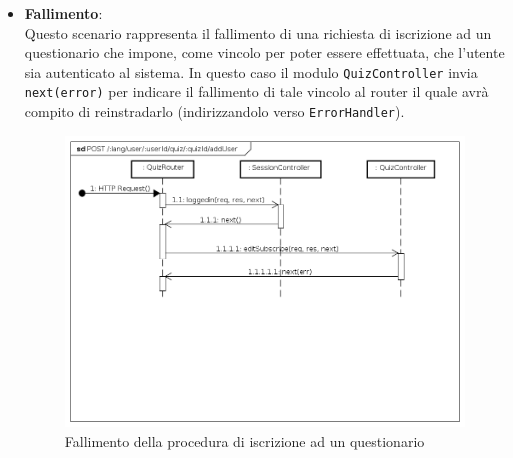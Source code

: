 \begin{itemize}
\item \textbf{Fallimento}:\\
Questo scenario rappresenta il fallimento di una richiesta di iscrizione ad un questionario che impone, come vincolo per poter essere effettuata, che l'utente sia autenticato al sistema. In questo caso il modulo \texttt{QuizController} invia \texttt{next(error)} per indicare il fallimento di tale vincolo al router il quale avrà compito di reinstradarlo (indirizzandolo verso \texttt{ErrorHandler}).
\label{Fallimento della procedura di iscrizione ad un questionario}
\begin{figure}[ht]
	\centering
	\includegraphics[scale=0.40]{UML/DiagrammiDiSequenza/Back-end/POST__lang_user_userId_quiz_quizId_addUser_failure.png}
	\caption{Fallimento della procedura di iscrizione ad un questionario}
\end{figure}
\FloatBarrier
\end{itemize}

